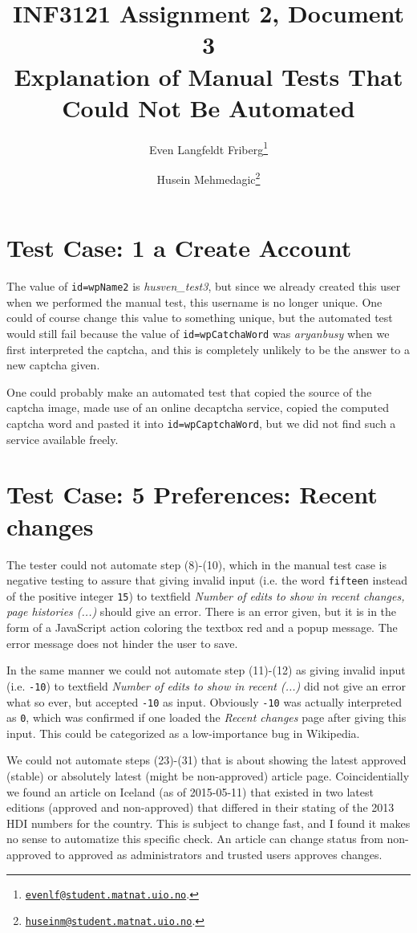 \documentclass[a4paper,10pt]{article}
\title{INF3121 Assignment 2, Document 3 \\ Explanation of Manual Tests That Could Not Be Automated}
\author{
Even Langfeldt Friberg\footnote{\href{mailto:evenlf@student.matnat.uio.no}{\nolinkurl{evenlf@student.matnat.uio.no}}.}
\and Husein Mehmedagic\footnote{\href{mailto:huseinm@student.matnat.uio.no}{\nolinkurl{huseinm@student.matnat.uio.no}}.}
}
\begin{document}
\maketitle

\section*{Test Case: 1 a Create Account}
The value of \texttt{id=wpName2} is \textit{husven\_test3}, but since we already created this user when we performed the manual test, this username is 
no longer unique. One could of course 
change this value to something unique, but the automated test would still fail because the value of \texttt{id=wpCatchaWord} was \textit{aryanbusy} when we first 
interpreted the captcha, and this is completely unlikely to be the answer to a new captcha given.

One could probably make an automated test that copied the source of the captcha image, made use of an online decaptcha service, copied the computed captcha word 
and pasted it into \texttt{id=wpCaptchaWord}, but we did not find such a service available freely.

\section*{Test Case: 5 Preferences: Recent changes}

The tester could not automate step (8)-(10), which in the manual test case is negative testing to assure that giving invalid input (i.e. the word \texttt{fifteen} 
instead of the positive integer \texttt{15}) to textfield \textit{Number of edits to show in recent changes, page histories (...)} should give an error. 
There is an error given, but it is in the form of a JavaScript action coloring the textbox red and a popup message. The error message does not hinder the user to 
save.

In the same manner we could not automate step (11)-(12) as giving invalid input (i.e. \texttt{-10}) to textfield \textit{Number of edits to show in recent (...)} 
did not give an error what so ever, but accepted \texttt{-10} as input. Obviously \texttt{-10} was actually interpreted as \texttt{0}, which was confirmed if 
one loaded the \textit{Recent changes} page after giving this input. This could be categorized as a low-importance bug in Wikipedia.

We could not automate steps (23)-(31) that is about showing the latest approved (stable) or absolutely latest (might be non-approved) article page. Coincidentially we 
found an article on Iceland (as of 2015-05-11) that existed in two latest editions (approved and non-approved) that differed in their stating of the 2013 HDI numbers for the country. This 
is subject to change fast, and I found it makes no sense to automatize this specific check. An article can change status from non-approved to approved as administrators and 
trusted users approves changes.
\end{document}
